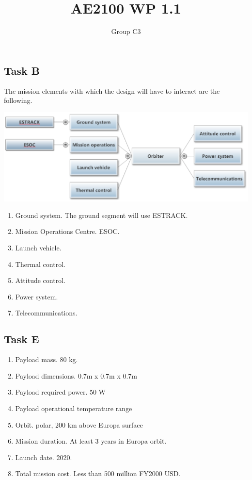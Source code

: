 \documentclass{article}
\title{AE2100 WP 1.1}
\author{Group C3}
\begin{document}
\maketitle
\subsection*{Task B}

The mission elements with which the design will have to interact are
the following.

\includegraphics[scale=.65]{block-diagram-WP1-1B.eps}

\begin{enumerate}
\item{Ground system.} The ground segment will use ESTRACK.
\item{Mission Operations Centre.} ESOC.
\item{Launch vehicle.}
\item{Thermal control.}
\item{Attitude control.}
\item{Power system.}
\item{Telecommunications.}
\end{enumerate}

\subsection*{Task E}
\begin{enumerate}
  \item{Payload mass.} 80 \si{kg}.
  \item{Payload dimensions.} 0.7m x 0.7m x 0.7m
  \item{Payload required power.} 50 W
  \item{Payload operational temperature range}
  \item{Orbit.} polar, 200 km above Europa surface
  \item{Mission duration.} At least 3 years in Europa orbit.
  \item{Launch date.} 2020.
  \item{Total mission cost.} Less than 500 million FY2000 USD.
\end{enumerate}
\end{document}
